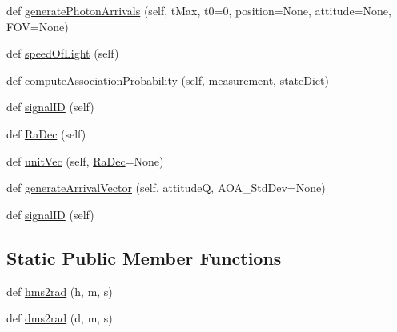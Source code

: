 \begin{DoxyCompactItemize}
\item 
def \hyperlink{classmodest_1_1signals_1_1xraysource_1_1PeriodicXRaySource_a92e5ec6d50060b4019c9d85b19cdb8b9}{generate\+Photon\+Arrivals} (self, t\+Max, t0=0, position=None, attitude=None, F\+OV=None)
\item 
def \hyperlink{classmodest_1_1signals_1_1xraysource_1_1PeriodicXRaySource_abb733ac2d1c8b307ca068989929dba13}{speed\+Of\+Light} (self)
\item 
def \hyperlink{classmodest_1_1signals_1_1poissonsource_1_1DynamicPoissonSource_a6c8820d8007c848d745f9313efdb970c}{compute\+Association\+Probability} (self, measurement, state\+Dict)
\item 
def \hyperlink{classmodest_1_1signals_1_1signalsource_1_1SignalSource_a9a64c6a9c2954f6ad61e4ca3518ea8ab}{signal\+ID} (self)
\item 
def \hyperlink{classmodest_1_1signals_1_1pointsource_1_1PointSource_a295eb1a487e18c77029585ac2785db80}{Ra\+Dec} (self)
\item 
def \hyperlink{classmodest_1_1signals_1_1pointsource_1_1PointSource_a133933430a784107258901e257778221}{unit\+Vec} (self, \hyperlink{classmodest_1_1signals_1_1pointsource_1_1PointSource_a295eb1a487e18c77029585ac2785db80}{Ra\+Dec}=None)
\item 
def \hyperlink{classmodest_1_1signals_1_1pointsource_1_1PointSource_abf359a17cf5bec4c51deef87c9e92cce}{generate\+Arrival\+Vector} (self, attitudeQ, A\+O\+A\+\_\+\+Std\+Dev=None)
\item 
def \hyperlink{classmodest_1_1signals_1_1signalsource_1_1SignalSource_a9a64c6a9c2954f6ad61e4ca3518ea8ab}{signal\+ID} (self)
\end{DoxyCompactItemize}
\subsection*{Static Public Member Functions}
\begin{DoxyCompactItemize}
\item 
def \hyperlink{classmodest_1_1signals_1_1xraysource_1_1PeriodicXRaySource_ae9e07e0f728014ba3b6af0022d6367fe}{hms2rad} (h, m, s)
\item 
def \hyperlink{classmodest_1_1signals_1_1xraysource_1_1PeriodicXRaySource_a117b7c3ff21b26887d74fce01ffad0a8}{dms2rad} (d, m, s)
\end{DoxyCompactItemize}
